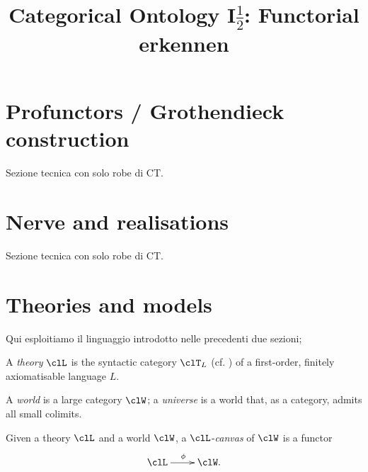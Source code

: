 \documentclass[a4paper]{../birkjour}
\title{Categorical Ontology I$\frac{1}{2}$: Functorial erkennen}
\begin{document}
\maketitle
\tableofcontents


\section{Profunctors / Grothendieck construction}
\label{sec:org7dd09e1}
Sezione tecnica con solo robe di CT.
\section{Nerve and realisations}
\label{sec:org1a423df}
Sezione tecnica con solo robe di CT.
\section{Theories and models}
\label{sec:orge02f333}
Qui esploitiamo il linguaggio introdotto nelle precedenti due sezioni;
\begin{definition}[Theory]
  A \emph{theory} $\clL$ is the syntactic category $\clT_L$ (cf. \cite{lambek1988introduction}) of a first-order, finitely axiomatisable language $L$.
\end{definition}
\begin{definition}
  A \emph{world} is a large category $\clW$; a \emph{universe} is a world that, as a category, admits all small colimits.
\end{definition}
Given a theory $\clL$ and a world $\clW$, a $\clL$-\emph{canvas} of $\clW$ is a functor 
\[\xymatrix{\clL \ar[r]^\phi & \clW.}\]
\end{document}
